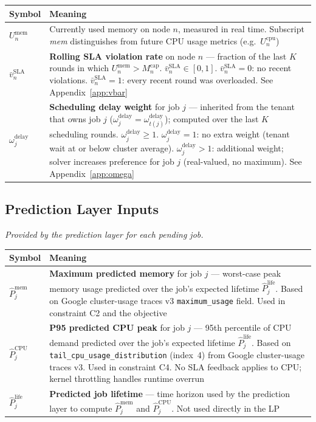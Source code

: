 \documentclass[11pt]{article}
\newcommand{\vbarsla}{\bar{v}_n^{\text{SLA}}}
\newcommand{\Mcap}{M_n^{\text{cap}}}
\newcommand{\Umem}{U_n^{\text{mem}}}
\newcommand{\omdelay}{\omega_j^{\text{delay}}}
\newcommand{\Pmem}{\hat{P}_j^{\text{mem}}}
\newcommand{\Pcpu}{\hat{P}_j^{\text{CPU}}}
\newcommand{\Plife}{\hat{P}_j^{\text{life}}}
\begin{document}
\medskip
\begin{center}
\begin{tabular}{@{}l p{10.5cm}@{}}
\toprule
Symbol & Meaning \\
\midrule
$\Umem$ & Currently used memory on node $n$, measured in real time.
  Subscript \textit{mem} distinguishes from future CPU usage metrics
  (e.g.\ $U_n^{\text{cpu}}$) \\[6pt]
$\vbarsla$ & \textbf{Rolling SLA violation rate} on node $n$ --- fraction of
  the last $K$ rounds in which $\Umem > \Mcap$.
  $\bar{v}_n^{\text{SLA}} \in [0,1]$.
  $\vbarsla = 0$: no recent violations. \quad
  $\vbarsla = 1$: every recent round was overloaded.
  See Appendix~\ref{app:vbar} \\[6pt]
$\omdelay$ & \textbf{Scheduling delay weight} for job $j$ --- inherited from
  the tenant that owns job $j$ ($\omdelay = \omega_{t(j)}^{\text{delay}}$);
  computed over the last $K$ scheduling rounds. $\omdelay \geq 1$. \quad
  $\omdelay = 1$: no extra weight (tenant wait at or below cluster average).
  $\omdelay > 1$: additional weight; solver increases preference for job $j$
  (real-valued, no maximum). See Appendix~\ref{app:omega} \\
\bottomrule
\end{tabular}
\end{center}

\subsection*{Prediction Layer Inputs}
\textit{Provided by the prediction layer for each pending job.}

\medskip
\begin{center}
\begin{tabular}{@{}l p{10.5cm}@{}}
\toprule
Symbol & Meaning \\
\midrule
$\Pmem$  & \textbf{Maximum predicted memory} for job $j$ --- worst-case peak
  memory usage predicted over the job's expected lifetime $\Plife$.
  Based on Google cluster-usage traces v3 \texttt{maximum\_usage} field.
  Used in constraint C2 and the objective \\[6pt]
$\Pcpu$  & \textbf{P95 predicted CPU peak} for job $j$ --- 95th percentile of
  CPU demand predicted over the job's expected lifetime $\Plife$.
  Based on \texttt{tail\_cpu\_usage\_distribution} (index~4) from Google
  cluster-usage traces v3. Used in constraint C4. No SLA feedback applies to
  CPU; kernel throttling handles runtime overrun \\[6pt]
$\Plife$ & \textbf{Predicted job lifetime} --- time horizon used by the
  prediction layer to compute $\Pmem$ and $\Pcpu$.
  Not used directly in the LP \\
\bottomrule
\end{tabular}
\end{center}
\end{document}
